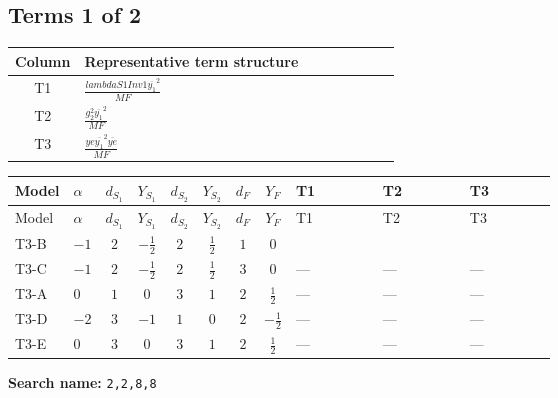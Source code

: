 \documentclass[8pt]{article}
\begin{document}
\begin{landscape}
\subsection*{Terms 1 of 2}
\begin{center}
\begin{tabular}{@{}c >{\raggedright\arraybackslash}p{0.82\linewidth}@{}}
\toprule
Column & Representative term structure \\
\midrule
T1 & \(\displaystyle \frac{lambdaS1Inv1 \overline{y_{1}}^{2}}{MF}\) \\
\midrule
T2 & \(\displaystyle \frac{g_{2}^{2} \overline{y_{1}}^{2}}{MF}\) \\
\midrule
T3 & \(\displaystyle \frac{ye \overline{y_{1}}^{2} \overline{ye}}{MF}\) \\
\midrule
\bottomrule
\end{tabular}
\end{center}
\smallskip
\tiny
\begin{longtable}{@{}llcccccc >{\raggedright\arraybackslash}p{0.21\linewidth} >{\raggedright\arraybackslash}p{0.21\linewidth} >{\raggedright\arraybackslash}p{0.21\linewidth}@{}}
\toprule
Model & $\alpha$ & $d_{S_1}$ & $Y_{S_1}$ & $d_{S_2}$ & $Y_{S_2}$ & $d_F$ & $Y_F$ & T1 & T2 & T3 \\
\midrule
\endfirsthead
\toprule
Model & $\alpha$ & $d_{S_1}$ & $Y_{S_1}$ & $d_{S_2}$ & $Y_{S_2}$ & $d_F$ & $Y_F$ & T1 & T2 & T3 \\
\midrule
\endhead
T3-B & $-1$ & $2$ & $-\frac{1}{2}$ & $2$ & $\frac{1}{2}$ & $1$ & $0$ & \scriptsize\adjustbox{max width=\linewidth}{$\begin{gathered} \frac{lambdaS1Inv1 \overline{y_{1}}^{2}}{2 MF}\end{gathered}$} & \scriptsize\adjustbox{max width=\linewidth}{$\begin{gathered} \frac{3 g_{2}^{2} \overline{y_{1}}^{2}}{4 MF}\end{gathered}$} & \scriptsize\adjustbox{max width=\linewidth}{$\begin{gathered} - \frac{ye \overline{y_{1}}^{2} \overline{ye}}{4 MF}\end{gathered}$} \\
\midrule
T3-C & $-1$ & $2$ & $-\frac{1}{2}$ & $2$ & $\frac{1}{2}$ & $3$ & $0$ & --- & --- & --- \\
\midrule
T3-A & $0$ & $1$ & $0$ & $3$ & $1$ & $2$ & $\frac{1}{2}$ & --- & --- & --- \\
\midrule
T3-D & $-2$ & $3$ & $-1$ & $1$ & $0$ & $2$ & $-\frac{1}{2}$ & --- & --- & --- \\
\midrule
T3-E & $0$ & $3$ & $0$ & $3$ & $1$ & $2$ & $\frac{1}{2}$ & --- & --- & --- \\
\midrule
\bottomrule
\end{longtable}
\clearpage
\noindent\textbf{Search name: }\texttt{2,2,8,8}\par\smallskip

\end{landscape}
\end{document}
